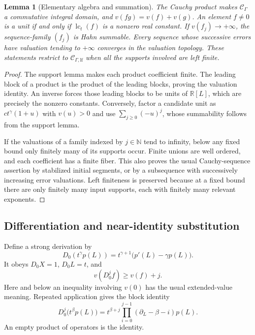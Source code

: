 \documentclass[11pt,a4paper]{article}
\newtheorem{lemma}[theorem]{Lemma}
\theoremstyle{definition}
\theoremstyle{remark}
\newcommand{\R}{\mathbb R}
\newcommand{\N}{\mathbb N}
\newcommand{\C}{\mathcal C_\Gamma}
\newcommand{\Clf}{\mathcal C_{\Gamma,\mathrm{lf}}}
\newcommand{\lc}{\operatorname{lc}_t}
\begin{document}
\begin{lemma}[Elementary algebra and summation]\label{lem:algebra}
The Cauchy product makes $\C$ a commutative integral domain, and
$v(fg)=v(f)+v(g)$. An element $f\ne0$ is a unit if and only if $\lc(f)$ is a
nonzero real constant. If $v(f_j)\to+\infty$, the sequence-family $(f_j)$ is
Hahn summable. Every sequence whose successive errors have valuation tending
to $+\infty$ converges in the valuation topology. These statements restrict
to $\Clf$ when all the supports involved are left finite.
\end{lemma}
\begin{proof}
The support lemma makes each product coefficient finite. The leading block
of a product is the product of the leading blocks, proving the valuation
identity. An inverse forces those leading blocks to be units of $\R[L]$,
which are precisely the nonzero constants. Conversely, factor a candidate
unit as $ct^\gamma(1+u)$ with $v(u)>0$ and use
$\sum_{j\ge0}(-u)^j$, whose summability follows from the support lemma.

If the valuations of a family indexed by $j\in\N$ tend to infinity, below
any fixed bound only finitely many of its supports occur. Finite unions are
well ordered, and each coefficient has a finite fiber. This also proves the
usual Cauchy-sequence assertion by stabilized initial segments, or by a
subsequence with successively increasing error valuations. Left finiteness
is preserved because at a fixed bound there are only finitely many input
supports, each with finitely many relevant exponents.
\end{proof}

\subsection{Differentiation and near-identity substitution}
Define a strong derivation by
\begin{equation}\label{eq:D0}
 D_0(t^\gamma p(L))=t^{\gamma+1}\bigl(p'(L)-\gamma p(L)\bigr).
\end{equation}
It obeys $D_0X=1$, $D_0L=t$, and
\begin{equation}\label{eq:Dgain}
 v(D_0^j f)\ge v(f)+j.
\end{equation}
Here and below an inequality involving $v(0)$ has the usual extended-value
meaning. Repeated application gives the block identity
\begin{equation}\label{eq:blockD}
 D_0^j\bigl(t^\beta p(L)\bigr)
 =t^{\beta+j}\prod_{i=0}^{j-1}(\partial_L-\beta-i)p(L).
\end{equation}
An empty product of operators is the identity.
\end{document}
